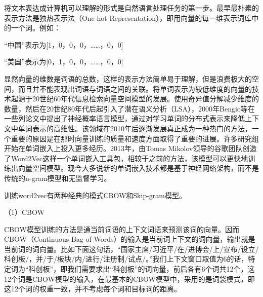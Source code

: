 \documentclass[winfonts,master,oneside,nobackinfo]{njuthesis}
\begin{document}
将文本表达成计算机可以理解的形式是自然语言处理任务的第一步。最早最朴素的表示方法是独热表示法（One-hot Representation），即用向量的每一维表示词库中的一个词。例如：

“中国”表示为[1，0，0，0，……，0，0]

“美国”表示为[0，1，0，0，……，0，0]

显然向量的维数是词语的总数，这样的表示方法简单易于理解，但是浪费极大的空间，而且并不能表现出词语与词语之间的关联。将单词表示为较低维度的向量的技术起源于20世纪60年代信息检索向量空间模型的发展。使用奇异值分解减少维度的数量，然后在20世纪80年代后起引入了潜在语义分析（LSA），2000年Bengio等\cite{Bengio}在一些列论文中提出了神经概率语言模型，通过对学习单词的分布式表示来降低上下文中单词表示的高维性。该领域在2010年后逐渐发展真正成为一种热门的方法，一个重要的原因是在那时向量训练的质量和速度方面取得了重要的进展。许多研究组开始在单词嵌入上投入更多经历。2013年，由Tomas Mikolov领导的谷歌团队创造了Word2Vec这样一个单词嵌入工具包，相较于之前的方法，该模型可以更快地训练出向量空间模型。现今大多说新的单词嵌入技术都是基于神经网络架构，而不是传统的n-gram模型和无监督学习。

训练word2vec有两种经典的模式CBOW和Skip-gram模型。

（1）CBOW

CBOW模型训练的方法是通当前词语的上下文词语来预测该词的向量。因而CBOW（Continuous Bag-of-Words）的输入是当前词上下文的词向量，输出就是当前词的词向量。比如下面这句话，“国家主席/习近平/在/进博会/上/宣布/设立/科创板/，并/于/板块/内/进行/注册制/试点/。”我们上下文窗口取值为6的话，特定词为“科创板”，即我们需要求出“科创板”的词向量，前后各有6个词共12个，这12个词是CBOW模型的输入，在最基本的CBOW模型中，采用的是词袋模式，即这12个词的权重一致，并不考虑每个词和目标词的距离。
\end{document}
